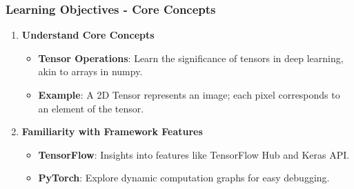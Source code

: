 \documentclass[aspectratio=169]{beamer}
\begin{document}
\begin{frame}[fragile]
    \frametitle{Learning Objectives - Core Concepts}
    \begin{enumerate}
        \item \textbf{Understand Core Concepts}
        \begin{itemize}
            \item \textbf{Tensor Operations}: Learn the significance of tensors in deep learning, akin to arrays in numpy.
            \item \textbf{Example}: A 2D Tensor represents an image; each pixel corresponds to an element of the tensor.
        \end{itemize}
        
        \item \textbf{Familiarity with Framework Features}
        \begin{itemize}
            \item \textbf{TensorFlow}: Insights into features like TensorFlow Hub and Keras API.
            \item \textbf{PyTorch}: Explore dynamic computation graphs for easy debugging.
        \end{itemize}
    \end{enumerate}
\end{frame}
\end{document}
